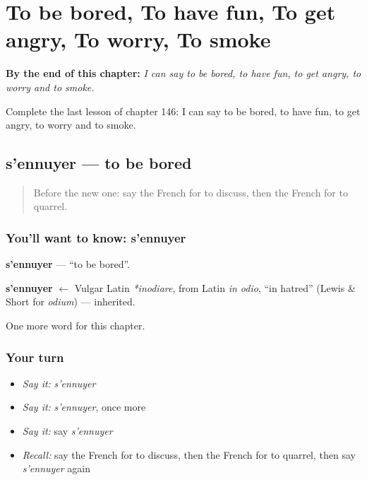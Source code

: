 
\chapter{To be bored, To have fun, To get angry, To worry, To smoke}
\label{ch:fr-to-be-bored-to-have-fun-to-get-angry-to-worry-to-smoke}

\begin{chapteropening}
\textbf{By the end of this chapter:} \emph{I can say to be bored, to have fun, to get angry, to worry and to smoke.}

Complete the last lesson of chapter 146: I can say to be bored, to have fun, to get angry, to worry and to smoke.
\end{chapteropening}

\section[s'ennuyer]{s'ennuyer — to be bored}

\label{lesson:FR-C146-ennuyer}



\begin{quote}
Before the new one: say the French for to discuss, then the French for to quarrel.
\end{quote}

\subsection*{You'll want to know: s'ennuyer}
\textbf{s'ennuyer} — \textquotedblleft{}to be bored\textquotedblright{}.

\begin{cousinweb}
\textbf{s'ennuyer} $\leftarrow$ Vulgar Latin \emph{*inodiare}, from Latin \emph{in odio}, \textquotedblleft{}in hatred\textquotedblright{} (Lewis \& Short for \emph{odium}) — inherited.
\end{cousinweb}

\begin{grammarlens}[title={What you've built}]
One more word for this chapter.
\end{grammarlens}

\subsection*{Your turn}
\begin{itemize}
\raggedright
  \item \emph{Say it:} \emph{s'ennuyer}
  \item \emph{Say it:} \emph{s'ennuyer}, once more
  \item \emph{Say it:} say \emph{s'ennuyer}
  \item \emph{Recall:} say the French for to discuss, then the French for to quarrel, then say \emph{s'ennuyer} again
\end{itemize}

